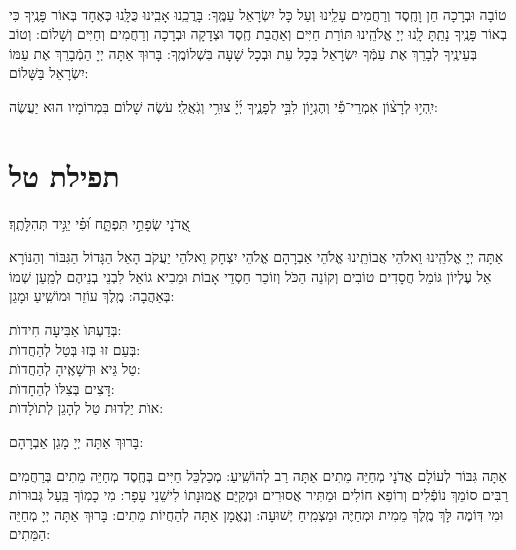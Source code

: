 \documentclass[twoside, openany, parskip=half, 11pt]{book}
\begin{document}
\\
 טוֹבָה וּבְרָכָה חֵן וָחֶֽסֶד וְרַחֲמִים עָלֵֽינוּ וְעַל כָּל יִשְׂרָאֵל עַמֶּֽךָ: בָּרֲכֵֽנוּ אָבִֽינוּ כֻּלָּֽנוּ כְּאֶחָד בְּאוֹר פָּנֶֽיךָ כִּי בְאוֹר פָּנֶֽיךָ נָתַֽתָּ לָֽנוּ יְיָ אֱלֹהֵֽינוּ תּוֹרַת חַיִּים וְאַהֲבַת חֶֽסֶד וּצְדָקָה וּבְרָכָה וְרַחֲמִים וְחַיִּים וְשָׁלוֹם: וְטוֹב בְּעֵינֶֽיךָ לְבָרֵךְ אֶת עַמְּֿךָ יִשְׂרָאֵל בְּכָל עֵת וּבְכָל שָׁעָה בִּשְׁלוֹמֶֽךָ: בָּרוּךְ אַתָּה יְיָ הַמְֿבָרֵךְ אֶת עַמּוֹ יִשְׂרָאֵל בַּשָּׁלוֹם:

 יִֽהְי֥וּ לְרָצ֨וֹן אִמְרֵי־פִ֡י וְהֶגְי֣וֹן לִבִּ֣י לְפָנֶ֑יךָ יְ֜יָ֗ צוּרִ֥י וְגֹֽאֲלִֽי׃ עֹשֶׂה שָׁלוֹם בִּמְרוֹמָיו הוּא יַעֲשֶׂה:

 \vfill 
  \pageref{einkelokeinu}
 

 \sepline
 
 \clearpage

\section[תפילת טל]{ תפילת טל }
\label{tefilastal}


 \begin{small}
אֲ֭דֹנָי שְׂפָתַ֣י תִּפְתָּ֑ח וּ֝פִ֗י יַגִּ֥יד תְּהִלָּתֶֽךָ׃
\\
\end{small} 
 אַתָּה יְיָ אֱלֹהֵֽינוּ וֵאלֹהֵי אֲבוֹתֵֽינוּ אֱלֹהֵי אַבְרָהָם אֱלֹהֵי יִצְחָק וֵאלֹהֵי יַעֲקֹב הָאֵל הַגָּדוֹל הַגִּבּוֹר וְהַנּוֹרָא אֵל עֶלְיוֹן גּוֹמֵל חֲסָדִים טוֹבִים וְקוֹנֵה הַכֹּל וְזוֹכֵר חַסְדֵי אָבוֹת וּמֵבִיא גוֹאֵל לִבְנֵי בְנֵיהֶם לְמַֽעַן שְׁמוֹ בְּאַהֲבָה: מֶֽלֶךְ עוֹזֵר וּמוֹשִֽׁיעַ וּמָגֵן:


\begin{large}
 בְּדַעְתּוׂ אַבִּיעָה חִידוׂת: \\
בְּעַם זוּ בְּזוּ בְּטַל לְהַחֲדוׂת:\\
טַל גֵּיא וּדְשָׁאֶֽיהָ לְהַחֲדוׂת: \\
דָּצִים בְּצִלּוׂ לְהֵחָדוׂת:\\
אוׂת יַלְדוּת טַל לְהָגֵן לְתוׂלָדוׂת:

\end{large}


בָּרוּךְ אַתָּה יְיָ מָגֵן אַבְרָהָם:

אַתָּה גִּבּוֹר לְעוֹלָם אֲדֹנָי מְחַיֵּה מֵתִים אַתָּה רַב לְהוֹשִֽׁיעַ: מְכַלְכֵּל חַיִּים בְּחֶֽסֶד מְחַיֵּה מֵתִים בְּרַחֲמִים רַבִּים סוֹמֵךְ נוֹפְֿלִים וְרוֹפֵא חוֹלִים וּמַתִּיר אֲסוּרִים וּמְקַיֵּם אֱמוּנָתוֹ לִישֵׁנֵי עָפָר: מִי כָמֽוֹךָ בַּֽעַל גְּבוּרוֹת וּמִי דּֽוֹמֶה לָּךְ מֶֽלֶךְ מֵמִית וּמְחַיֶּה וּמַצְמִֽיחַ יְשׁוּעָה: וְנֶאֱמָן אַתָּה לְהַחֲיוֹת מֵתִים: בָּרוּךְ אַתָּה יְיָ מְחַיֵּה הַמֵּתִים:
\end{document}
